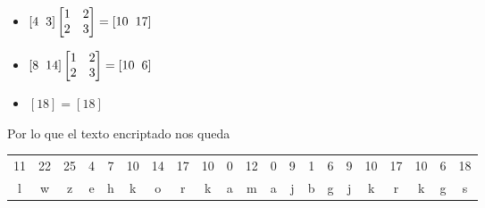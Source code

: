 \begin{multicols}{2}
\begin{itemize}
    \item $\left[4\hspace{2mm}3\right]\begin{bmatrix}1 & 2 \\ 2 & 3 \end{bmatrix}=\left[10\hspace{2mm}17\right]$
    \item $\left[8\hspace{2mm}14\right]\begin{bmatrix}1 & 2 \\ 2 & 3 \end{bmatrix}=\left[10\hspace{2mm}6\right]$
    \item $\left[18\right]=\left[18\right]$
\end{itemize}
\end{multicols}
Por lo que el texto encriptado nos queda
\begin{center}
\begin{tabular}{c c c c c c c c c c c c c c c c c c c c c }
    11 & 22 & 25 & 4 & 7 & 10 & 14 & 17 & 10 & 0 & 12 & 0 & 9 & 1 & 6 & 9 & 10 & 17 & 10 & 6 & 18\\
    l & w & z & e & h & k & o & r & k & a & m & a & j & b & g & j & k & r & k & g & s
\end{tabular}
\end{center}